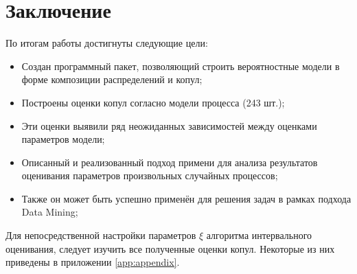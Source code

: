 \chapter{Заключение}	%

По итогам работы достигнуты следующие цели:
\begin{itemize}
  \item Создан программный пакет, позволяющий строить вероятностные модели в форме композиции распределений и копул;
  \item Построены оценки копул согласно модели процесса (243 шт.);
  \item Эти оценки выявили ряд неожиданных зависимостей между оценками параметров модели;
  \item Описанный и реализованный подход примени для анализа результатов оценивания параметров произвольных случайных процессов;
  \item Также он может быть успешно применён для решения задач в рамках подхода Data Mining;
\end{itemize}

Для непосредственной настройки параметров $\xi$ алгоритма интервального оценивания, следует изучить все полученные оценки копул. Некоторые из них приведены в приложении \ref{app:appendix}.

\clearpage